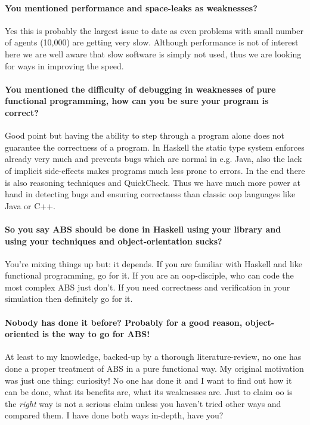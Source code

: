 \paragraph{You mentioned performance and space-leaks as weaknesses?}
Yes this is probably the largest issue to date as even problems with small number of agents (10,000) are getting very slow. Although performance is not of interest here we are well aware that slow software is simply not used, thus we are looking for ways in improving the speed.

\paragraph{You mentioned the difficulty of debugging in weaknesses of pure functional programming, how can you be sure your program is correct?}
Good point but having the ability to step through a program alone does not guarantee the correctness of a program. In Haskell the static type system enforces already very much and prevents bugs which are normal in e.g. Java, also the lack of implicit side-effects makes programs much less prone to errors. In the end there is also reasoning techniques and QuickCheck. Thus we have much more power at hand in detecting bugs and ensuring correctness than classic oop languages like Java or C++.

\paragraph{So you say ABS should be done in Haskell using your library and using your techniques and object-orientation sucks?}
You're mixing things up but: it depends. If you are familiar with Haskell and like functional programming, go for it. If you are an oop-disciple, who can code the most complex ABS just don't. If you need correctness and verification in your simulation then definitely go for it. 

\paragraph{Nobody has done it before? Probably for a good reason, object-oriented is the way to go for ABS!}
At least to my knowledge, backed-up by a thorough literature-review, no one has done a proper treatment of ABS in a pure functional way. My original motivation was just one thing: curiosity! No one has done it and I want to find out how it can be done, what its benefits are, what its weaknesses are. Just to claim oo is the \textit{right} way is not a serious claim unless you haven't tried other ways and compared them. I have done both ways in-depth, have you?

